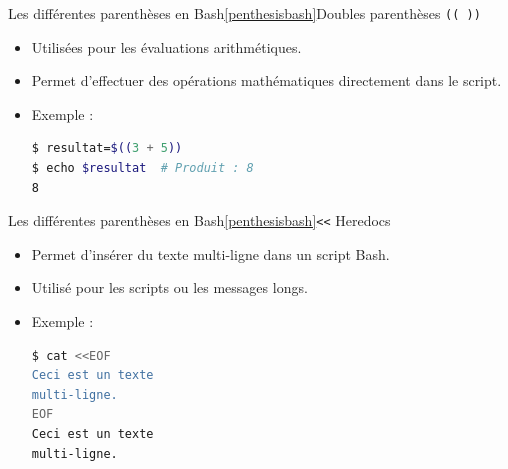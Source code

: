 \documentclass{beamer}
\begin{document}
    \begin{frame}[fragile]{Les différentes parenthèses en Bash\cref{penthesisbash}}{Doubles parenthèses \lstinline{(( ))}}
        \begin{itemize}
            \item Utilisées pour les évaluations arithmétiques.
            \item Permet d'effectuer des opérations mathématiques directement dans le script.
            \item Exemple :
            \begin{lstlisting}[language=bash]
$ resultat=$((3 + 5))
$ echo $resultat  # Produit : 8
8
            \end{lstlisting}
        \end{itemize}
    \end{frame}

    \begin{frame}[fragile]{Les différentes parenthèses en Bash\cref{penthesisbash}}{\lstinline{<<} Heredocs}
        \begin{itemize}
            \item Permet d'insérer du texte multi-ligne dans un script Bash.
            \item Utilisé pour les scripts ou les messages longs.
            \item Exemple :
            \begin{lstlisting}[language=bash]
$ cat <<EOF
Ceci est un texte
multi-ligne.
EOF
Ceci est un texte
multi-ligne.
            \end{lstlisting}
        \end{itemize}
    \end{frame}
\end{document}
